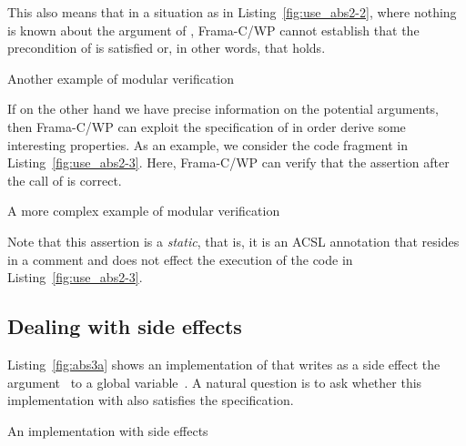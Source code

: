 This also means that in a situation as in Listing~\ref{fig:use_abs2-2},
where nothing is known about the argument of , 
Frama-C\slash WP cannot establish that the precondition of  is satisfied
or, in other words, that  holds.

\begin{listing}[hbt]
\begin{minipage}{\textwidth}

\end{minipage}
\caption{\label{fig:use_abs2-2} Another example of modular verification}
\end{listing}

\clearpage

If on the other hand we have precise information on the potential
arguments, then Frama-C\slash WP can exploit the specification of 
 in order derive some interesting properties.
As an example, we consider the code fragment in Listing~\ref{fig:use_abs2-3}.
Here, Frama-C\slash WP can verify that the assertion after 
the call of  is correct.


\begin{listing}[hbt]
\begin{minipage}{\textwidth}

\end{minipage}
\caption{\label{fig:use_abs2-3} A more complex example of modular verification}
\end{listing}

Note that this assertion is a \emph{static}, that is, it is
an ACSL annotation that resides in a comment and does not effect
the execution of the code in Listing~\ref{fig:use_abs2-3}.

\clearpage

\subsection{Dealing with side effects}

Listing~\ref{fig:abs3a} shows an implementation of 
that writes as a side effect the argument~ to a global variable~.
A natural question is to ask whether this implementation with
also satisfies the specification.

\begin{listing}[hbt]
\begin{minipage}{\textwidth}

\end{minipage}
\caption{\label{fig:abs3a} An implementation with side effects}
\end{listing}

